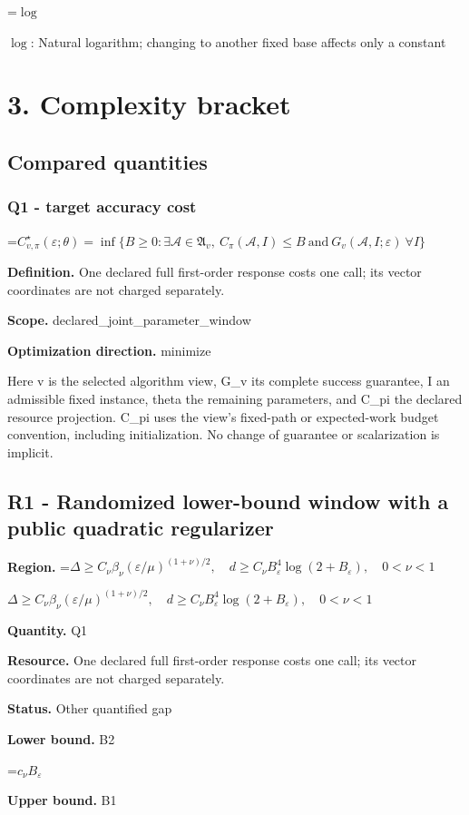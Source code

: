 \documentclass[10pt,a4paper]{article}
\newcommand{\AtlasMath}[1]{\par\begingroup\centering\setbox0=\hbox{$\displaystyle #1$}\ifdim\wd0>1.4\linewidth\typeout{ATLAS WIDE FORMULA: \the\wd0}\fi\ifdim\wd0>\linewidth\resizebox{\linewidth}{!}{\box0}\else\box0\fi\par\endgroup}
\newcommand{\AtlasInlineMath}[1]{\begingroup\setbox0=\hbox{$#1$}\ifdim\wd0>.4\linewidth\endgroup\AtlasMath{#1}\else\endgroup$#1$\fi}
\begin{document}
\AtlasInlineMath{\log}: Natural logarithm; changing to another fixed base affects only a constant

\section{3. Complexity bracket}
\subsection{Compared quantities}
\subsubsection{Q1 - target accuracy cost}
\AtlasMath{C^\star_{v,\pi}(\varepsilon;\theta)=\inf\{B\ge0:\exists\mathcal A\in\mathfrak A_v,\ C_\pi(\mathcal A,I)\le B\ \text{and}\ G_v(\mathcal A,I;\varepsilon)\ \forall I\}}
\textbf{Definition.} One declared full first-order response costs one call; its vector coordinates are not charged separately.

\textbf{Scope.} declared\_joint\_parameter\_window

\textbf{Optimization direction.} minimize

Here v is the selected algorithm view, G\_v its complete success guarantee, I an admissible fixed instance, theta the remaining parameters, and C\_pi the declared resource projection. C\_pi uses the view's fixed-path or expected-work budget convention, including initialization. No change of guarantee or scalarization is implicit.

\subsection{R1 - Randomized lower-bound window with a public quadratic regularizer}
\textbf{Region.} \AtlasInlineMath{\Delta\ge C_\nu\beta_\nu(\varepsilon/\mu)^{(1+\nu)/2},\quad d\ge C_\nu B_\varepsilon^4\log(2+B_\varepsilon),\quad0<\nu<1}

\textbf{Quantity.} Q1

\textbf{Resource.} One declared full first-order response costs one call; its vector coordinates are not charged separately.

\textbf{Status.} Other quantified gap

\textbf{Lower bound.} B2

\AtlasMath{c_\nu B_\varepsilon}
\textbf{Upper bound.} B1
\end{document}
